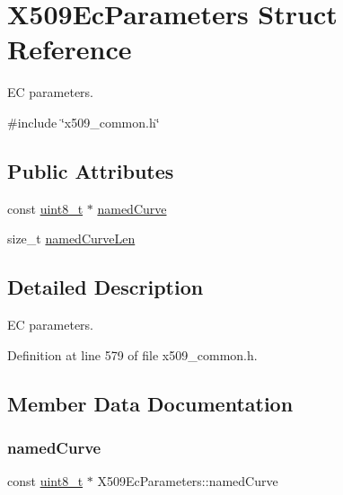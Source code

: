 \hypertarget{structX509EcParameters}{}\section{X509\+Ec\+Parameters Struct Reference}
\label{structX509EcParameters}


EC parameters.  




{\ttfamily \#include \char`\"{}x509\+\_\+common.\+h\char`\"{}}

\subsection*{Public Attributes}
\begin{DoxyCompactItemize}
\item 
const \hyperlink{stdint_8h_aba7bc1797add20fe3efdf37ced1182c5}{uint8\+\_\+t} $\ast$ \hyperlink{structX509EcParameters_a122c5387fb2f12374a905ecfd2ca4c86}{named\+Curve}
\item 
size\+\_\+t \hyperlink{structX509EcParameters_ac58081bd63ed68d0cb101ff7e65667ec}{named\+Curve\+Len}
\end{DoxyCompactItemize}


\subsection{Detailed Description}
EC parameters. 

Definition at line 579 of file x509\+\_\+common.\+h.



\subsection{Member Data Documentation}
\mbox{\label{structX509EcParameters_a122c5387fb2f12374a905ecfd2ca4c86}} 
\subsubsection{\texorpdfstring{named\+Curve}{namedCurve}}
{\footnotesize\ttfamily const \hyperlink{stdint_8h_aba7bc1797add20fe3efdf37ced1182c5}{uint8\+\_\+t} $\ast$ X509\+Ec\+Parameters\+::named\+Curve}



